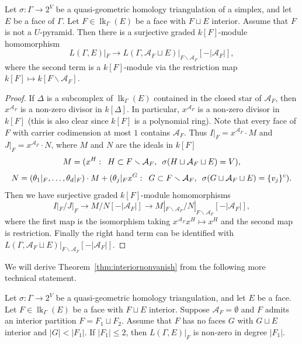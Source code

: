 \documentclass[ALCO, Unicode,published]{cedram}
\DeclareMathOperator{\lk}{lk}
\begin{document}
\begin{lemma}\label{lem:restriction}
Let $\sigma\colon \Gamma \to 2^V$ be a quasi-geometric homology triangulation of a simplex, and let $E$ be a face of $\Gamma$. Let $F \in \lk_{\Gamma}(E)$ be a face with $F \sqcup E$ interior. Assume that $F$ is not a $U$-pyramid. 
Then there is a surjective graded $k[F]$-module homomorphism
$$L(\Gamma, E)|_{F} \to L(\Gamma, \mathcal{A}_F \sqcup E)|_{F \smallsetminus \mathcal{A}_F}[-\vert \mathcal{A}_F \vert],$$
where the second term is a $k[F]$-module via the restriction map  $k[F] \mapsto k[F \smallsetminus \mathcal{A}_F]$.
\end{lemma}



\begin{proof}
If $\Delta$ is a subcomplex of $\lk_{\Gamma}(E)$ contained in the closed star of $\mathcal{A}_F$, then $x^{\mathcal{A}_F}$ is a non-zero divisor in $k[\Delta]$. In particular, $x^{\mathcal{A}_F}$ is a non-zero divisor in $k[F]$ (this is also clear since $k[F]$ is a polynomial ring). Note that every face of $F$ with carrier codimension at most $1$ contains $\mathcal{A}_F$. Thus $I|_F = x^{\mathcal{A}_F} \cdot M$ and $J|_F = x^{\mathcal{A}_F} \cdot N$, where 
$M$ and $N$ are the ideals in $k[F]$ 
\[
M = (x^H: \enskip H \subset F \smallsetminus \mathcal{A}_F, \enskip \sigma(H \sqcup \mathcal{A}_F \sqcup E) = V),
\]
\[
N = (\theta_1|_F,\ldots,\theta_{d}|_F) \cdot M + (\theta_{j}|_{F} x^G: \enskip G \subset F \smallsetminus \mathcal{A}_F, \enskip \sigma(G \sqcup \mathcal{A}_F \sqcup E) = \{v_j\}^c).
\]
Then we have surjective graded $k[F]$-module homomorphisms
\[
I|_F/J|_F \rightarrow M /N [-|\mathcal{A}_F|] \rightarrow  M|_{F \smallsetminus \mathcal{A}_F}/N|_{F \smallsetminus \mathcal{A}_F}[-|\mathcal{A}_F|], 
\]
where the first map is the isomorphism taking $x^{\mathcal{A}_F} x^H \mapsto x^H$ and the second map is restriction. Finally the right hand term can be identified with $L(\Gamma, \mathcal{A}_F \sqcup E)|_{F \smallsetminus \mathcal{A}_F}[-\vert \mathcal{A}_F \vert]$.
\end{proof}

We will derive Theorem~\ref{thm:interiornonvanish} from  the following more technical statement.

\begin{theorem}\label{thm:localizedcase}
Let $\sigma\colon \Gamma \to 2^V$ be a quasi-geometric homology triangulation, and let $E$ be a face. Let $F \in \lk_{\Gamma}(E)$ be a face with $F \sqcup E$ interior. Suppose $\mathcal{A}_F = \emptyset$ and $F$ admits an interior partition $F = F_1 \sqcup F_2$. Assume that $F$ has no faces $G$ with $G \sqcup E$ interior and $ \vert G \vert < \vert F_1 \vert$. If $\vert F_1 \vert \le 2$, then $L(\Gamma, E)|_{F}$ is non-zero in degree $\vert F_1 \vert$. 
\end{theorem}
\end{document}
